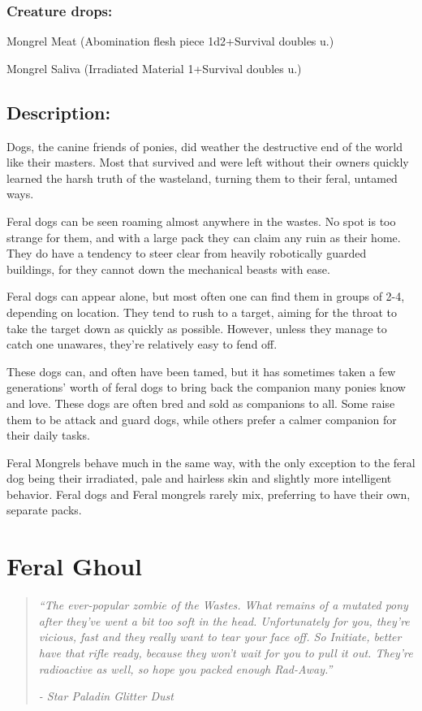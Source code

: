 \documentclass[11pt,a4paper,twocolumn]{book}
\begin{document}
	\subsubsection*{Creature drops:}
	\begin{compactitem}
		\item Mongrel Meat (Abomination flesh piece 1d2+Survival doubles u.)
		\item Mongrel Saliva (Irradiated Material 1+Survival doubles u.)
	\end{compactitem}
	
	\subsection*{Description:}
	Dogs, the canine friends of ponies, did weather the destructive end of the world like their masters. Most that survived and were left without their owners quickly learned the harsh truth of the wasteland, turning them to their feral, untamed ways. 
	
	Feral dogs can be seen roaming almost anywhere in the wastes. No spot is too strange for them, and with a large pack they can claim any ruin as their home. They do have a tendency to steer clear from heavily robotically guarded buildings, for they cannot down the mechanical beasts with ease.
	
	\bigskip
	Feral dogs can appear alone, but most often one can find them in groups of 2-4, depending on location. They tend to rush to a target, aiming for the throat to take the target down as quickly as possible. However, unless they manage to catch one unawares, they're relatively easy to fend off.
	
	These dogs can, and often have been tamed, but it has sometimes taken a few generations' worth of feral dogs to bring back the companion many ponies know and love. These dogs are often bred and sold as companions to all. Some raise them to be attack and guard dogs, while others prefer a calmer companion for their daily tasks. 
	
	\bigskip
	Feral Mongrels behave much in the same way, with the only exception to the feral dog being their irradiated, pale and hairless skin and slightly more intelligent behavior. Feral dogs and Feral mongrels rarely mix, preferring to have their own, separate packs.
	
	\clearpage
	
	\section*{Feral Ghoul}
	\begin{quote}
		\emph{``The ever-popular zombie of the Wastes. What remains of a mutated pony after they've went a bit too soft in the head. Unfortunately for you, they're vicious, fast and they really want to tear your face off. So Initiate, better have that rifle ready, because they won't wait for you to pull it out. They're radioactive as well, so hope you packed enough Rad-Away.''}
		
		\emph{-	Star Paladin Glitter Dust}
	\end{quote}
	
\end{document}
